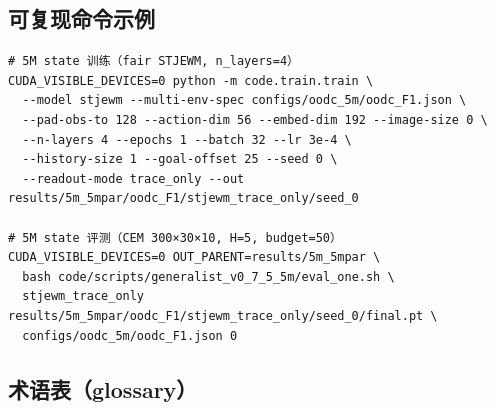 \documentclass[11pt,a4paper]{article}
\begin{document}
\subsection{可复现命令示例}

\begin{scriptsize}
\begin{verbatim}
# 5M state 训练（fair STJEWM, n_layers=4）
CUDA_VISIBLE_DEVICES=0 python -m code.train.train \
  --model stjewm --multi-env-spec configs/oodc_5m/oodc_F1.json \
  --pad-obs-to 128 --action-dim 56 --embed-dim 192 --image-size 0 \
  --n-layers 4 --epochs 1 --batch 32 --lr 3e-4 \
  --history-size 1 --goal-offset 25 --seed 0 \
  --readout-mode trace_only --out results/5m_5mpar/oodc_F1/stjewm_trace_only/seed_0

# 5M state 评测（CEM 300×30×10, H=5, budget=50）
CUDA_VISIBLE_DEVICES=0 OUT_PARENT=results/5m_5mpar \
  bash code/scripts/generalist_v0_7_5_5m/eval_one.sh \
  stjewm_trace_only results/5m_5mpar/oodc_F1/stjewm_trace_only/seed_0/final.pt \
  configs/oodc_5m/oodc_F1.json 0
\end{verbatim}
\end{scriptsize}

\subsection{术语表（glossary）}
\end{document}
